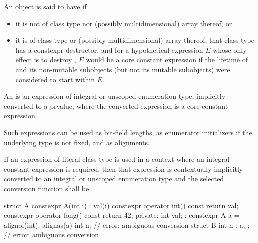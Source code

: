 \pnum
An object  is said to have  if
\begin{itemize}
\item
  it is not of class type nor (possibly multidimensional) array thereof, or
\item
  it is of class type or (possibly multidimensional) array thereof,
  that class type has a constexpr destructor, and
  for a hypothetical expression $E$
  whose only effect is to destroy ,
  $E$ would be a core constant expression
  if the lifetime of  and its non-mutable subobjects
  (but not its mutable subobjects) were considered to start within $E$.
\end{itemize}

\pnum
An 
is an expression of integral or
unscoped enumeration type, implicitly converted to a prvalue, where the converted expression is a core constant expression.
\begin{note}
Such expressions can be
used as bit-field lengths, as enumerator
initializers if the underlying type is not fixed,
and as alignments.
\end{note}

\pnum
If an expression of literal class type is used in a context where an
integral constant expression is required, then that expression is
contextually implicitly converted to an integral or unscoped
enumeration type
and the selected conversion function shall be .
\begin{example}
\begin{codeblock}
struct A {
  constexpr A(int i) : val(i) { }
  constexpr operator int() const { return val; }
  constexpr operator long() const { return 42; }
private:
  int val;
};
constexpr A a = alignof(int);
alignas(a) int n;               // error: ambiguous conversion
struct B { int n : a; };        // error: ambiguous conversion
\end{codeblock}
\end{example}

